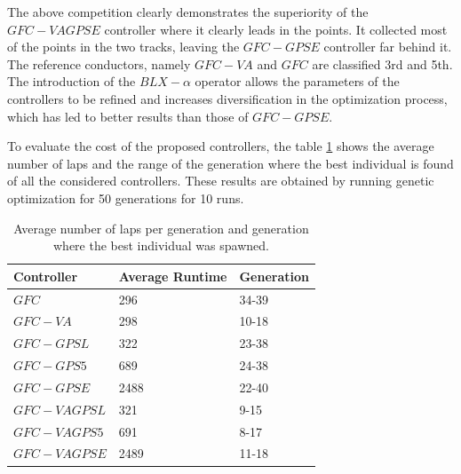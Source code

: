 \documentclass[10pt,journal,compsoc]{IEEEtran}
\begin{document}
The above competition clearly demonstrates the superiority of the $GFC-VAGPSE$ controller where it clearly leads in the points. It collected most of the points in the two tracks, leaving the $GFC-GPSE$ controller far behind it. The reference conductors, namely $GFC-VA$ and $GFC$  are classified 3rd and 5th.
The introduction of the $BLX-\alpha$ operator allows the parameters of the controllers to be refined and  increases diversification in the optimization process, which has led to better results than those of $GFC-GPSE$.

To evaluate the cost of the proposed controllers, the table \ref{tab:time} shows the average number of laps %
and the range of the generation where the best individual is found of all the considered controllers. These results are obtained by running genetic
optimization for 50 generations for 10 runs.  

\begin{table}[!ht]
	\centering
	{\scriptsize
          \caption{Average number of laps per generation %
            and
                  generation where the best individual was spawned.}
		\label{tab:time}
		\begin{tabular}{|p{2.85cm}|p{1.65cm}|p{1.65cm}|}
			\hline 	
			\hline  
			Controller& \textbf{Average Runtime}&\textbf{Generation}\\
                  \hline \textbf{\textbf{$GFC$}} \cite{salem_cig2018}&296 &34-39\\
			\hline \textbf{$GFC-VA$} \cite{DBLP:conf/cig/SalemMG19}&298	&10-18\\	
			\hline \textbf{$GFC-GPSL$} \cite{DBLP:conf/cig/SalemMG19}& 322&23-38\\	
			\hline \textbf{$GFC-GPS5$} \cite{DBLP:conf/cig/SalemMG19}&689	&24-38\\	
			\hline \textbf{$GFC-GPSE$}&	2488&22-40\\	
			\hline \textbf{$GFC-VAGPSL$} \cite{DBLP:conf/cig/SalemMG19}&321	&9-15\\	
			\hline\textbf{$GFC-VAGPS5$} \cite{DBLP:conf/cig/SalemMG19}&	691&8-17\\	
			\hline\textbf{$GFC-VAGPSE$}&2489	&11-18\\					
			\hline 
		\end{tabular}
		
	}
\end{table} 
\end{document}

